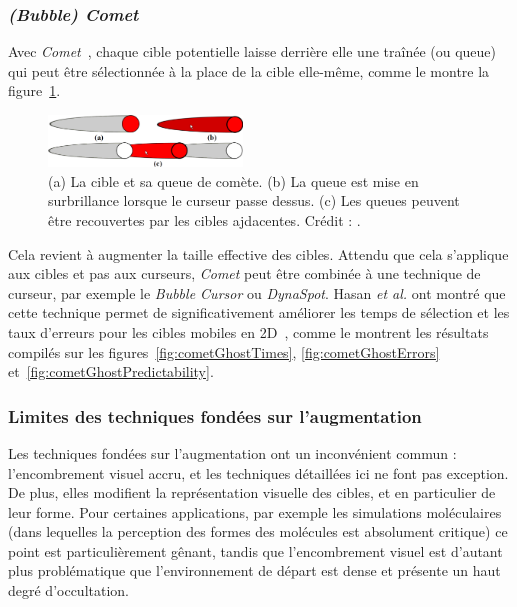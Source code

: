 	\subsubsection{\emph{(Bubble) Comet}}
	Avec \emph{Comet}~\cite{hasan2011comet}, chaque cible potentielle laisse derrière elle une traînée (ou queue) qui peut être sélectionnée à la place de la cible elle-même, comme le montre la figure~\ref{fig:comet}.

	\begin{figure}
		\centering
		\includegraphics[width=0.46\textwidth]{figures/ch2/comet}
		\caption[La technique \emph{Comet}]{(a) La cible et sa queue de comète. (b) La queue est mise en surbrillance lorsque le curseur passe dessus. (c) Les queues peuvent être recouvertes par les cibles ajdacentes. Crédit : \cite{hasan2011comet}.}
		\label{fig:comet}
	\end{figure}
	
	Cela revient à augmenter la taille effective des cibles. Attendu que cela s'applique aux cibles et pas aux curseurs, \emph{Comet} peut être combinée à une technique de curseur, par exemple le \emph{Bubble Cursor} ou \emph{DynaSpot}. Hasan \emph{et al.} ont montré que cette technique permet de significativement améliorer les temps de sélection et les taux d'erreurs pour les cibles mobiles en 2D~\cite{hasan2011comet}, comme le montrent les résultats compilés sur les figures~\ref{fig:cometGhostTimes}, \ref{fig:cometGhostErrors} et~\ref{fig:cometGhostPredictability}.

	\subsubsection{Limites des techniques fondées sur l'augmentation}
	Les techniques fondées sur l'augmentation ont un inconvénient commun : l'encombrement visuel accru, et les techniques détaillées ici ne font pas exception. De plus, elles modifient la représentation visuelle des cibles, et en particulier de leur forme. Pour certaines applications, par exemple les simulations moléculaires (dans lequelles la perception des formes des molécules est absolument critique) ce point est particulièrement gênant, tandis que l'encombrement visuel est d'autant plus problématique que l'environnement de départ est dense et présente un haut degré d'occultation.

